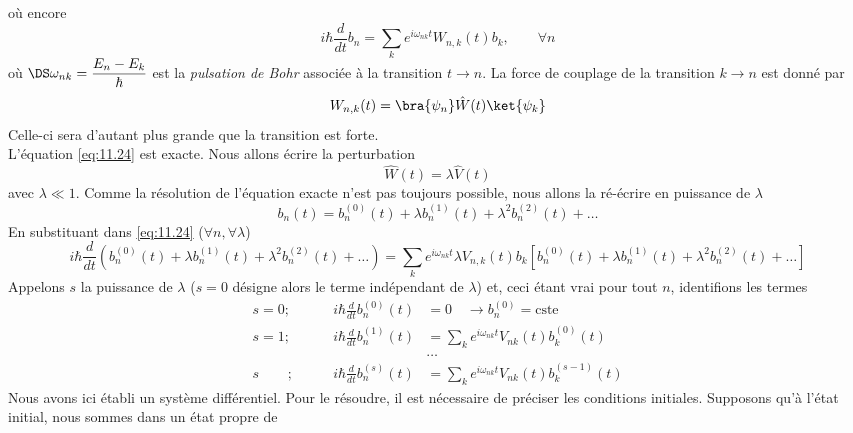		où encore
		\begin{equation}
		i\hbar \dfrac{d}{dt}b_n = \sum_k e^{i\omega_{nk}t} W_{n,k}(t)b_k,\qquad \forall n
		\label{eq:11.24}
		\end{equation}
		où $\DS \omega_{nk} = \dfrac{E_n-E_k}{\hbar}$ est la \textit{pulsation de Bohr} associée à 
		la transition $t\rightarrow n$. La force de couplage de la transition $k\rightarrow n$ est 
		donné par 
		\begin{equation}
		W_{n,k}(t) = \bra{\psi_n}\hat{W}(t)\ket{\psi_k}
		\end{equation}
		Celle-ci sera d'autant plus grande que la transition est forte.\\
		L'équation \eqref{eq:11.24} est exacte. Nous allons écrire la perturbation
		\begin{equation}
		\hat{W}(t) = \lambda\hat{V}(t)
		\end{equation}
		avec $\lambda \ll 1$. Comme la résolution de l'équation exacte n'est pas toujours possible, 
		nous allons la ré-écrire en puissance de $\lambda$ 
		\begin{equation}
		b_n(t) = b_n^{(0)}(t) + \lambda b_n^{(1)}(t) + \lambda^2 b_n^{(2)}(t)+\dots
		\end{equation}
		En substituant dans \eqref{eq:11.24} ($\forall n, \forall\lambda$)
		\begin{equation}
		i\hbar \dfrac{d}{dt}(b_n^{(0)}(t) + \lambda b_n^{(1)}(t) + \lambda^2 b_n^{(2)}(t)+\dots) = 
		\sum_k e^{i\omega_{nk}t} \lambda V_{n,k}(t)b_k[b_n^{(0)}(t) + \lambda b_n^{(1)}(t) + 
		\lambda^2 b_n^{(2)}(t)+\dots]
		\end{equation}
		Appelons $s$ la puissance de $\lambda$ ($s=0$ désigne alors le terme indépendant de 
		$\lambda$) et, ceci étant vrai pour tout $n$, identifions les termes
		\begin{equation}
		\begin{array}{lll}
		s=0; &\qquad i\hbar\frac{d}{dt}b_n^{(0)}(t) &= 0\quad \rightarrow b_n^{(0)} = \text{cste}\\
		s=1; &\qquad i\hbar\frac{d}{dt}b_n^{(1)}(t) &= \sum_k e^{i\omega_{nk}t}V_{nk}(t)b_k^{(0)}(t)\\
		&&\dots\\
		s\phantom{=1}\ ; &\qquad i\hbar\frac{d}{dt}b_n^{(s)}(t) &= \sum_k e^{i\omega_{nk}t}V_{nk}(t)b_k^{(s-1)}(t)
		\end{array}
		\end{equation}
		Nous avons ici établi un système différentiel. Pour le résoudre, il est nécessaire de préciser 
		les conditions initiales. Supposons qu'à l'état initial, nous sommes dans un état propre de 
